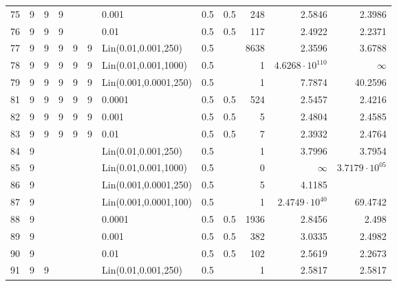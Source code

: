 \begin{longtable}{lrrrrrlrrrrr}
  75 &       9 & 9 & 9 &   &   &                 0.001 &  0.5 &    0.5 &     248 &                 2.5846 &                2.3986 \\
  76 &       9 & 9 & 9 &   &   &                  0.01 &  0.5 &    0.5 &     117 &                 2.4922 &                2.2371 \\
  77 &       9 & 9 & 9 & 9 & 9 &   Lin(0.01,0.001,250) &  0.5 &        &    8638 &                 2.3596 &                3.6788 \\
  78 &       9 & 9 & 9 & 9 & 9 &  Lin(0.01,0.001,1000) &  0.5 &        &       1 & $4.6268\cdot 10^{110}$ &              $\infty$ \\
  79 &       9 & 9 & 9 & 9 & 9 & Lin(0.001,0.0001,250) &  0.5 &        &       1 &                 7.7874 &               40.2596 \\
  81 &       9 & 9 & 9 & 9 & 9 &                0.0001 &  0.5 &    0.5 &     524 &                 2.5457 &                2.4216 \\
  82 &       9 & 9 & 9 & 9 & 9 &                 0.001 &  0.5 &    0.5 &       5 &                 2.4804 &                2.4585 \\
  83 &       9 & 9 & 9 & 9 & 9 &                  0.01 &  0.5 &    0.5 &       7 &                 2.3932 &                2.4764 \\
  84 &       9 &   &   &   &   &   Lin(0.01,0.001,250) &  0.5 &        &       1 &                 3.7996 &                3.7954 \\
  85 &       9 &   &   &   &   &  Lin(0.01,0.001,1000) &  0.5 &        &       0 &               $\infty$ & $3.7179\cdot 10^{05}$ \\
  86 &       9 &   &   &   &   & Lin(0.001,0.0001,250) &  0.5 &        &       5 &                 4.1185 &                       \\
  87 &       9 &   &   &   &   & Lin(0.001,0.0001,100) &  0.5 &        &       1 &  $2.4749\cdot 10^{40}$ &               69.4742 \\
  88 &       9 &   &   &   &   &                0.0001 &  0.5 &    0.5 &    1936 &                 2.8456 &                 2.498 \\
  89 &       9 &   &   &   &   &                 0.001 &  0.5 &    0.5 &     382 &                 3.0335 &                2.4982 \\
  90 &       9 &   &   &   &   &                  0.01 &  0.5 &    0.5 &     102 &                 2.5619 &                2.2673 \\
  91 &       9 & 9 &   &   &   &   Lin(0.01,0.001,250) &  0.5 &        &       1 &                 2.5817 &                2.5817 \\

\end{longtable}
